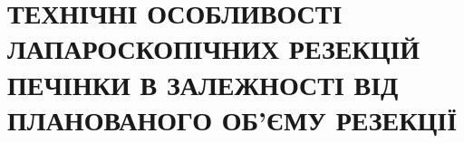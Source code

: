 \chapter{ТЕХНІЧНІ ОСОБЛИВОСТІ ЛАПАРОСКОПІЧНИХ РЕЗЕКЦІЙ ПЕЧІНКИ В ЗАЛЕЖНОСТІ ВІД ПЛАНОВАНОГО ОБ’ЄМУ РЕЗЕКЦІЇ}